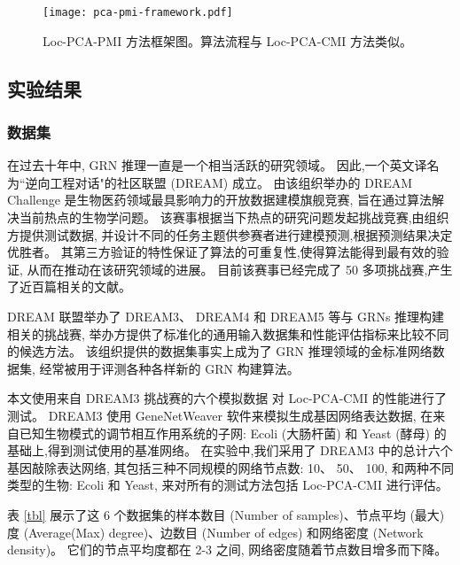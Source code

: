 \begin{figure}[!htbp]
  \centering
  \texttt{[image: pca-pmi-framework.pdf]}
  \caption{Loc-PCA-PMI 方法框架图。算法流程与 Loc-PCA-CMI 方法类似。}
  \label{pca-pmi-fr}
\end{figure}


\subsection{实验结果}

\subsubsection{数据集}

在过去十年中, GRN 推理一直是一个相当活跃的研究领域。
因此,一个英文译名为``逆向工程对话"的社区联盟 (DREAM) \cite{stolovitzky2007dialogue} 成立。
由该组织举办的 DREAM Challenge 是生物医药领域最具影响力的开放数据建模旗舰竞赛,
旨在通过算法解决当前热点的生物学问题。
该赛事根据当下热点的研究问题发起挑战竞赛,由组织方提供测试数据,
并设计不同的任务主题供参赛者进行建模预测,根据预测结果决定优胜者。
其第三方验证的特性保证了算法的可重复性,使得算法能得到最有效的验证,
从而在推动在该研究领域的进展。
目前该赛事已经完成了 50 多项挑战赛,产生了近百篇相关的文献。

DREAM 联盟举办了 DREAM3、
DREAM4 和 DREAM5 等与 GRNs 推理构建相关的挑战赛, 
举办方提供了标准化的通用输入数据集和性能评估指标来比较不同的候选方法。
该组织提供的数据集事实上成为了 GRN 推理领域的金标准网络数据集,
经常被用于评测各种各样新的 GRN 构建算法。

本文使用来自 DREAM3 挑战赛的六个模拟数据 \cite{schaffter2011genenetweaver} 对 Loc-PCA-CMI 的性能进行了测试。
 DREAM3 使用 GeneNetWeaver 软件来模拟生成基因网络表达数据,
在来自已知生物模式的调节相互作用系统的子网:
 Ecoli (大肠杆菌) 和 Yeast (酵母) 的基础上,得到测试使用的基准网络。 
在实验中,我们采用了 DREAM3 中的总计六个基因敲除表达网络,
其包括三种不同规模的网络节点数:
 10、 50、 100, 和两种不同类型的生物: Ecoli 和 Yeast, 
来对所有的测试方法包括 Loc-PCA-CMI 进行评估。

表 \ref{tbl} 展示了这 6 个数据集的样本数目 (Number of samples)、节点平均 (最大)度 (Average(Max) degree)、边数目 (Number of edges) 和网络密度 (Network density)。
它们的节点平均度都在 2-3 之间, 网络密度随着节点数目增多而下降。

